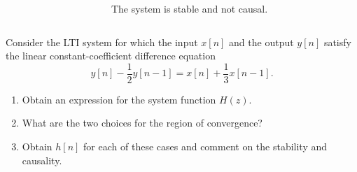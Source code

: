 \begin{frame}{}
    \begin{columns}
        \begin{column}{3in}
            \begin{center}
                
            \end{center}
        \end{column}
        \begin{column}{2in}
            \pause
                The system is stable and not causal.
        \end{column}
    \end{columns}
\end{frame}





\begin{frame}
    \begin{example}
        Consider the LTI system for which the input $x[n]$ and the output $y[n]$ satisfy the linear constant-coefficient difference equation
        \begin{equation*}
            y[n] - \frac{1}{2}y[n-1] = x[n] + \frac{1}{3}x[n-1].
        \end{equation*}
        \begin{enumerate}
            \item Obtain an expression for the system function $H(z)$.
            \item What are the two choices for the region of convergence?
            \item Obtain $h[n]$ for each of these cases and comment on the stability and causality.
        \end{enumerate}
    \end{example}
\end{frame} 